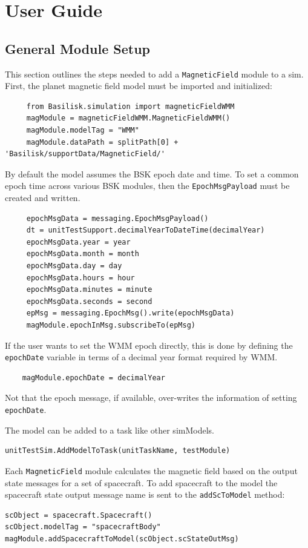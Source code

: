 
\section{User Guide}

\subsection{General Module Setup}
This section outlines the steps needed to add a {\tt MagneticField} module to a sim.
First, the planet magnetic field model must be imported and initialized:
\begin{verbatim}
     from Basilisk.simulation import magneticFieldWMM
     magModule = magneticFieldWMM.MagneticFieldWMM()
     magModule.modelTag = "WMM"
     magModule.dataPath = splitPath[0] + 'Basilisk/supportData/MagneticField/'
\end{verbatim}
By default the model assumes the BSK epoch date and time.  To set a common epoch time across various BSK modules, then the {\tt EpochMsgPayload} must be created and written.
\begin{verbatim}
     epochMsgData = messaging.EpochMsgPayload()
     dt = unitTestSupport.decimalYearToDateTime(decimalYear)
     epochMsgData.year = year
     epochMsgData.month = month
     epochMsgData.day = day
     epochMsgData.hours = hour
     epochMsgData.minutes = minute
     epochMsgData.seconds = second
     epMsg = messaging.EpochMsg().write(epochMsgData)
     magModule.epochInMsg.subscribeTo(epMsg)
\end{verbatim}
If the user wants to set the WMM epoch directly, this is done by defining the {\tt epochDate} variable in terms of a decimal year format required by WMM.
\begin{verbatim}
	magModule.epochDate = decimalYear
\end{verbatim}
Not that the epoch message, if available, over-writes the information of setting {\tt epochDate}.

The model can  be added to a task like other simModels.
\begin{verbatim}
unitTestSim.AddModelToTask(unitTaskName, testModule)
\end{verbatim}

Each {\tt MagneticField} module calculates the magnetic field based on the output state messages for a set of spacecraft.
To add spacecraft to the model the spacecraft state output message name is sent to the \verb|addScToModel| method:
\begin{verbatim}
scObject = spacecraft.Spacecraft()
scObject.modelTag = "spacecraftBody"
magModule.addSpacecraftToModel(scObject.scStateOutMsg)
\end{verbatim}

